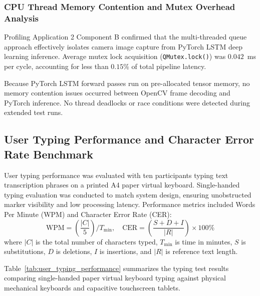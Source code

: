\subsubsection{CPU Thread Memory Contention and Mutex Overhead Analysis}
Profiling Application 2 Component B confirmed that the multi-threaded queue approach effectively isolates camera image capture from PyTorch LSTM deep learning inference. Average mutex lock acquisition (\texttt{QMutex.lock()}) was $0.042$~ms per cycle, accounting for less than $0.15\%$ of total pipeline latency.

Because PyTorch LSTM forward passes run on pre-allocated tensor memory, no memory contention issues occurred between OpenCV frame decoding and PyTorch inference. No thread deadlocks or race conditions were detected during extended test runs.

\subsection{User Typing Performance and Character Error Rate Benchmark}
\label{subsec:test_user_typing}
User typing performance was evaluated with ten participants typing text transcription phrases on a printed A4 paper virtual keyboard. Single-handed typing evaluation was conducted to match system design, ensuring unobstructed marker visibility and low processing latency. Performance metrics included Words Per Minute (WPM) and Character Error Rate (CER):
\begin{equation}
\text{WPM} = \left( \frac{|C|}{5} \right) / T_{\text{min}}, \quad
\text{CER} = \left( \frac{S + D + I}{|R|} \right) \times 100\%
\label{eq:wpm_cer_formulas}
\end{equation}
where $|C|$ is the total number of characters typed, $T_{\text{min}}$ is time in minutes, $S$ is substitutions, $D$ is deletions, $I$ is insertions, and $|R|$ is reference text length.

Table~\ref{tab:user_typing_performance} summarizes the typing test results comparing single-handed paper virtual keyboard typing against physical mechanical keyboards and capacitive touchscreen tablets.

\begin{table}[htbp]
\centering
\caption{User typing performance benchmark comparing input device modalities.}
\label{tab:user_typing_performance}
\end{table}

